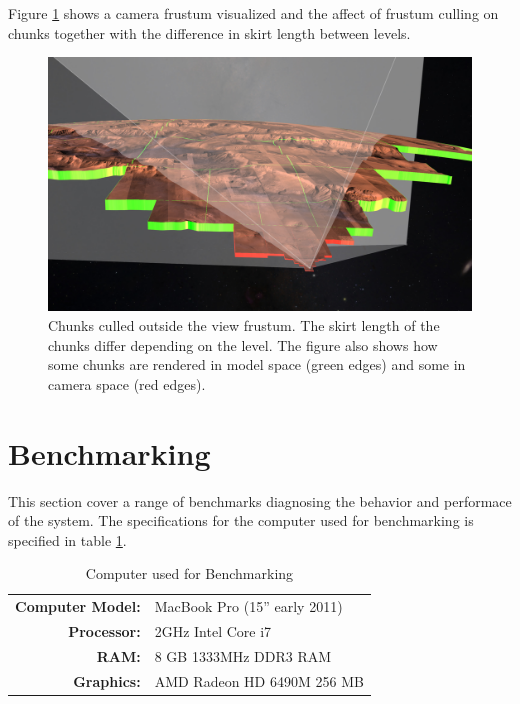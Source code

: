 Figure \ref{fig:frustummars} shows a camera frustum visualized and the affect of frustum culling on chunks together with the difference in skirt length between levels.

\begin{figure}[h]
    \centering
        \includegraphics[width=\textwidth]{figures/results/screenshots_thesis_old/frustum_mars.jpg}
    \caption{Chunks culled outside the view frustum. The skirt length of the chunks differ depending on the level. The figure also shows how some chunks are rendered in model space (green edges) and some in camera space (red edges).}
    \label{fig:frustummars}
\end{figure}

\clearpage
\section{Benchmarking}
\label{section:benchmarking}
\FloatBarrier
This section cover a range of benchmarks diagnosing the behavior and performace of the system. The specifications for the computer used for benchmarking is specified in table \ref{table:benchmark host}. 

\begin{table}[h]
  \centering
  \caption[]{Computer used for Benchmarking}
    \label{table:benchmark host}
  \begin{tabular}{| r l |}
    \hline
      \textbf{Computer Model:}  & MacBook Pro (15'' early 2011) \\
      \textbf{Processor:}       & 2GHz Intel Core i7 \\
      \textbf{RAM:}             & 8 GB 1333MHz DDR3 RAM \\
      \textbf{Graphics:}        & AMD Radeon HD 6490M 256 MB \\
    \hline
  \end{tabular}
\end{table}



